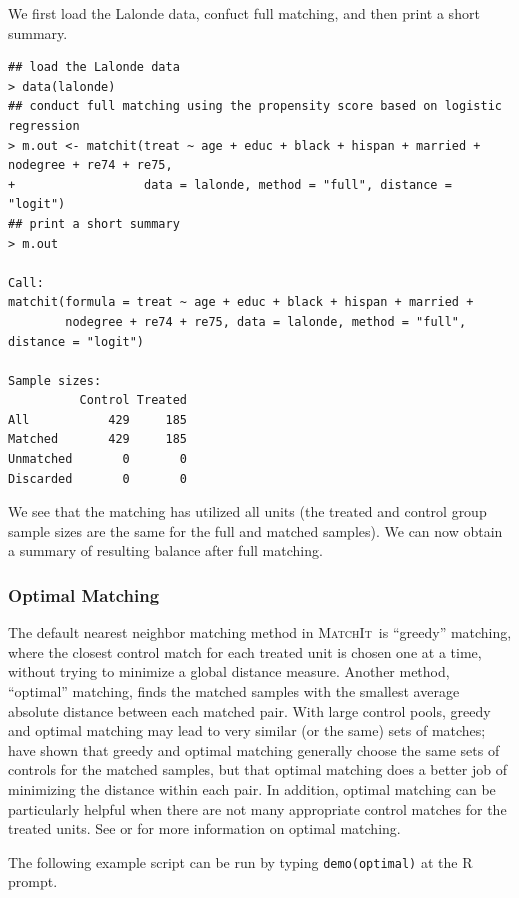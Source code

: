 \documentclass[oneside,letterpaper,titlepage]{article}
\newcommand{\MatchIt}{\textsc{MatchIt}}
\begin{document}
We first load the Lalonde data, confuct full matching, and then print
a short summary.
\begin{verbatim}
## load the Lalonde data
> data(lalonde)
## conduct full matching using the propensity score based on logistic regression
> m.out <- matchit(treat ~ age + educ + black + hispan + married + nodegree + re74 + re75, 
+                  data = lalonde, method = "full", distance = "logit")
## print a short summary
> m.out

Call: 
matchit(formula = treat ~ age + educ + black + hispan + married +     
        nodegree + re74 + re75, data = lalonde, method = "full", distance = "logit")

Sample sizes:
          Control Treated
All           429     185
Matched       429     185
Unmatched       0       0
Discarded       0       0
\end{verbatim}
We see that the matching has utilized all units (the treated and
control group sample sizes are the same for the full and matched
samples). We can now obtain a summary of resulting balance after full
matching.



\subsubsection{Optimal Matching}
\label{subsubsec:optimal}

The default nearest neighbor matching method in \MatchIt\ is
``greedy'' matching, where the closest control match for each treated
unit is chosen one at a time, without trying to minimize a global
distance measure.  Another method, ``optimal'' matching, finds the
matched samples with the smallest average absolute distance between
each matched pair.  With large control pools, greedy and optimal
matching may lead to very similar (or the same) sets of matches;
\citet{GuRos93} have shown that greedy and optimal matching generally
choose the same sets of controls for the matched samples, but that
optimal matching does a better job of minimizing the distance within
each pair.  In addition, optimal matching can be particularly helpful
when there are not many appropriate control matches for the treated
units.  See \cite{GuRos93} or \cite{Rosenbaum02} for more information
on optimal matching.

The following example script can be run by typing {\tt demo(optimal)}
at the R prompt.
\end{document}
